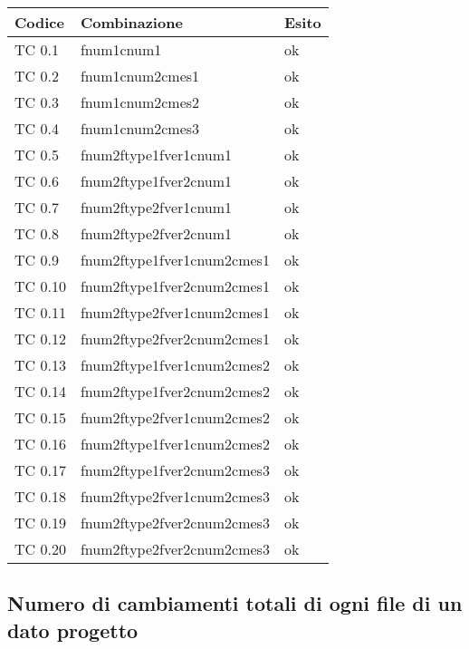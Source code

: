 	\begin{tabular}{|p{3cm}|p{7cm}|p{3cm}|}
		\hline
		\rowcolor{Gray}
		\textbf{Codice} & \textbf{Combinazione} & \textbf{Esito}\tabularnewline
\hline
TC 0.1 			& fnum1cnum1 					& ok \tabularnewline
\hline
TC 0.2 			& fnum1cnum2cmes1 				& ok \tabularnewline
\hline
TC 0.3 			& fnum1cnum2cmes2 				& ok \tabularnewline
\hline
TC 0.4 			& fnum1cnum2cmes3 				& ok \tabularnewline
\hline
TC 0.5 			& fnum2ftype1fver1cnum1 			& ok \tabularnewline
\hline
TC 0.6 			& fnum2ftype1fver2cnum1				& ok \tabularnewline
\hline
TC 0.7 			& fnum2ftype2fver1cnum1 			& ok \tabularnewline
\hline
TC 0.8 			& fnum2ftype2fver2cnum1 			& ok \tabularnewline
\hline
TC 0.9 			& fnum2ftype1fver1cnum2cmes1 			& ok \tabularnewline
\hline
TC 0.10 		& fnum2ftype1fver2cnum2cmes1 			& ok \tabularnewline
\hline
TC 0.11 		& fnum2ftype2fver1cnum2cmes1 			& ok \tabularnewline
\hline
TC 0.12			& fnum2ftype2fver2cnum2cmes1 			& ok \tabularnewline
\hline
TC 0.13			& fnum2ftype1fver1cnum2cmes2 			& ok \tabularnewline
\hline
TC 0.14			& fnum2ftype1fver2cnum2cmes2 			& ok \tabularnewline
\hline
TC 0.15			& fnum2ftype2fver1cnum2cmes2 			& ok \tabularnewline
\hline
TC 0.16			& fnum2ftype1fver1cnum2cmes2 			& ok \tabularnewline
\hline
TC 0.17			& fnum2ftype1fver2cnum2cmes3 			& ok \tabularnewline
\hline
TC 0.18			& fnum2ftype2fver1cnum2cmes3 			& ok \tabularnewline
\hline
TC 0.19			& fnum2ftype2fver2cnum2cmes3 			& ok \tabularnewline
\hline
TC 0.20			& fnum2ftype2fver2cnum2cmes3 			& ok \tabularnewline
\hline
	\end{tabular}
\clearpage




\subsection{Numero di cambiamenti totali di ogni file di un dato progetto}
		
